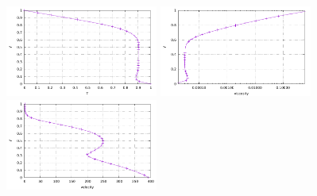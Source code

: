 \begin{center}
\includegraphics[width=5cm]{python_codes/fieldstone_28/results_case1/T_profile.pdf}
\includegraphics[width=5cm]{python_codes/fieldstone_28/results_case1/eta_profile.pdf}
\includegraphics[width=5cm]{python_codes/fieldstone_28/results_case1/V_profile.pdf}
\end{center}
\newpage
